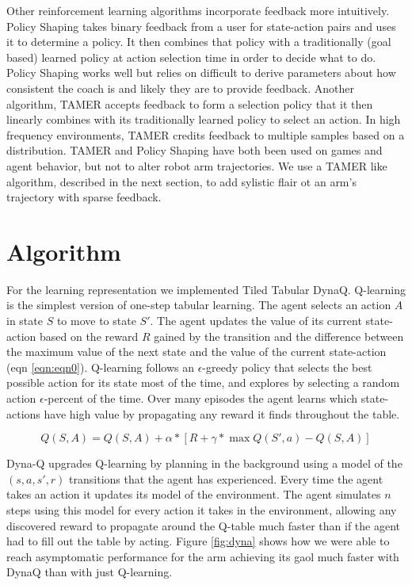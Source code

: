 \documentclass{article}
\begin{document}
Other reinforcement learning algorithms incorporate feedback more intuitively. Policy Shaping \cite{griffith_policy_2013} takes binary feedback from a user for state-action pairs and uses it to determine a policy. It then combines that policy with a traditionally (goal based) learned policy at action selection time in order to decide what to do. Policy Shaping works well but relies on difficult to derive parameters about how consistent the coach is and likely they are to provide feedback. Another algorithm, TAMER \cite{knox_reinforcement_2012} accepts feedback to form a selection policy that it then linearly combines with its traditionally learned policy to select an action. In high frequency environments, TAMER credits feedback to multiple samples based on a distribution. TAMER and Policy Shaping have both been used on games and agent behavior, but not to alter robot arm trajectories. We use a TAMER like algorithm, described in the next section, to add sylistic flair ot an arm's trajectory with sparse feedback.

\section{Algorithm}
For the learning representation we implemented Tiled Tabular DynaQ. Q-learning is the simplest version of one-step tabular learning. The agent selects an action $A$ in state $S$ to move to state $S'$. The agent updates the value of its current state-action based on the reward $R$ gained by the transition and the difference between the maximum value of the next state and the value of the current state-action (eqn \ref{eqn:eqn0}). Q-learning follows an $\epsilon$-greedy policy that selects the best possible action for its state most of the time, and explores by selecting a random action $\epsilon$-percent of the time. Over many episodes the agent learns which state-actions have high value by propagating any reward it finds throughout the table.

\begin{equation}\label{eqn:eqn0}
    Q(S,A) = Q(S,A) + \alpha * [R + \gamma * \max Q(S',a) - Q(S,A)]
\end{equation}

Dyna-Q \cite{sutton_introduction_1998} upgrades Q-learning by planning in the background using a model of the $(s,a,s',r)$ transitions that the agent has experienced. Every time the agent takes an action it updates its model of the environment. The agent simulates $n$ steps using this model for every action it takes in the environment, allowing any discovered reward to propagate around the Q-table much faster than if the agent had to fill out the table by acting. Figure \ref{fig:dyna} shows how we were able to reach asymptomatic performance for the arm achieving its gaol much faster with DynaQ than with just Q-learning.
\end{document}
